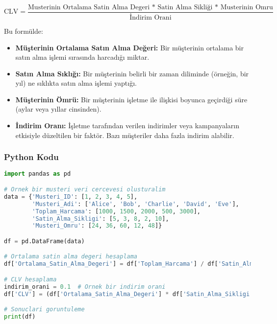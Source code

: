 \[\text{CLV} = \frac{\text{Musterinin Ortalama Satin Alma Degeri * Satin Alma Sikliği * Musterinin Omru}}{\text{İndirim Orani}}\]

Bu formülde:
\begin{itemize}
    \item \textbf{Müşterinin Ortalama Satın Alma Değeri:} Bir müşterinin ortalama bir satın alma işlemi sırasında harcadığı miktar.
    \item \textbf{Satın Alma Sıklığı:} Bir müşterinin belirli bir zaman diliminde (örneğin, bir yıl) ne sıklıkta satın alma işlemi yaptığı.
    \item \textbf{Müşterinin Ömrü:} Bir müşterinin işletme ile ilişkisi boyunca geçirdiği süre (aylar veya yıllar cinsinden).
    \item \textbf{İndirim Oranı:} İşletme tarafından verilen indirimler veya kampanyaların etkisiyle düzeltilen bir faktör. Bazı müşteriler daha fazla indirim alabilir.
\end{itemize}

\subsubsection{Python Kodu}

\begin{lstlisting}[language=Python, caption=CLV analizi örneği.]
import pandas as pd

# Ornek bir musteri veri cercevesi olusturalim
data = {'Musteri_ID': [1, 2, 3, 4, 5],
        'Musteri_Adi': ['Alice', 'Bob', 'Charlie', 'David', 'Eve'],
        'Toplam_Harcama': [1000, 1500, 2000, 500, 3000],
        'Satin_Alma_Sikligi': [5, 3, 8, 2, 10],
        'Musteri_Omru': [24, 36, 60, 12, 48]}

df = pd.DataFrame(data)

# Ortalama satin alma degeri hesaplama
df['Ortalama_Satin_Alma_Degeri'] = df['Toplam_Harcama'] / df['Satin_Alma_Sikligi']

# CLV hesaplama
indirim_orani = 0.1  # Ornek bir indirim orani
df['CLV'] = (df['Ortalama_Satin_Alma_Degeri'] * df['Satin_Alma_Sikligi'] * df['Musteri_Omru']) / (1 + indirim_orani)

# Sonuclari goruntuleme
print(df)
\end{lstlisting}

\newpage